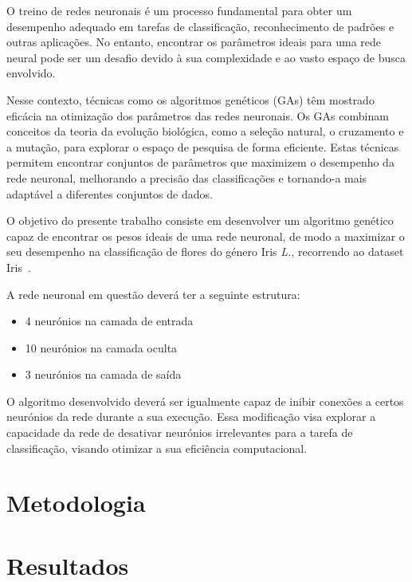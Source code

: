 \documentclass[a4paper, portuguese]{report}
\begin{document}
    O treino de redes neuronais é um processo fundamental para obter um desempenho adequado em tarefas de classificação, reconhecimento de padrões e outras aplicações.
    No entanto, encontrar os parâmetros ideais para uma rede neural pode ser um desafio devido à sua complexidade e ao vasto espaço de busca envolvido.

    Nesse contexto, técnicas como os algoritmos genéticos (GAs) têm mostrado eficácia na otimização dos parâmetros das redes neuronais.
    Os GAs combinam conceitos da teoria da evolução biológica, como a seleção natural, o cruzamento e a mutação, para explorar o espaço de pesquisa de forma eficiente.
    Estas técnicas permitem encontrar conjuntos de parâmetros que maximizem o desempenho da rede neuronal, melhorando a precisão das classificações e tornando-a mais adaptável a diferentes conjuntos de dados.

    O objetivo do presente trabalho consiste em desenvolver um algoritmo genético capaz de encontrar os pesos ideais de uma rede neuronal, de modo a maximizar o seu desempenho na classificação de flores do género Iris \textit{L.}, recorrendo ao dataset Iris~\cite{Fisher1988}.

    A rede neuronal em questão deverá ter a seguinte estrutura:
    \begin{itemize}
        \item 4 neurónios na camada de entrada
        \item 10 neurónios na camada oculta
        \item 3 neurónios na camada de saída
    \end{itemize}

    O algoritmo desenvolvido deverá ser igualmente capaz de inibir conexões a certos neurónios da rede durante a sua execução.
    Essa modificação visa explorar a capacidade da rede de desativar neurónios irrelevantes para a tarefa de classificação, visando otimizar a sua eficiência computacional.


    \chapter{Metodologia}\label{ch:methodology}
    


    \chapter{Resultados}\label{ch:results}
    
\end{document}

